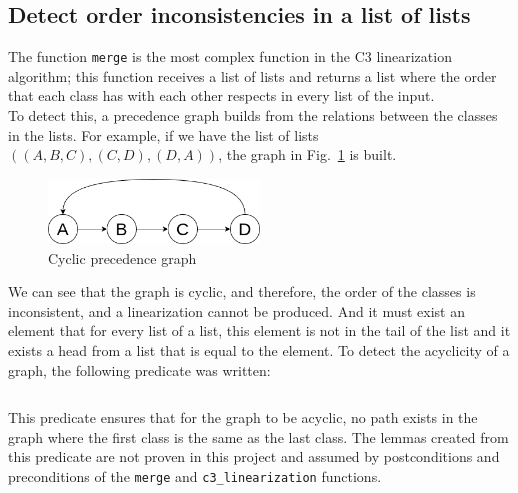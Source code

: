 \documentclass[runningheads]{llncs}
\begin{document}
\subsection{Detect order inconsistencies in a list of lists}
The function \texttt{merge} is the most complex function in the C3 linearization algorithm; this function receives a list of lists and returns a list where the order that each class has with each other respects in every list of the input.\\
To detect this, a precedence graph builds from the relations between the classes in the lists. For example, if we have the list of lists $((A, B, C),(C, D),(D, A))$, the graph in Fig.~\ref{fig:cyclicGraph} is built.
\begin{figure}[htbp]
  \centering
  \includegraphics[width=0.5\textwidth]{images/cyclicGraph.png}
  \caption{Cyclic precedence graph}
  \label{fig:cyclicGraph}
\end{figure}
We can see that the graph is cyclic, and therefore, the order of the classes is inconsistent, and a linearization cannot be produced.
And it must exist an element that for every list of a list, this element is not in the tail of the list and it exists a head from a list that is equal to the element. %
To detect the acyclicity of a graph, the following predicate was written:
\inputminted[firstline=64,lastline=80,fontsize=\small,linenos,xleftmargin=20pt]{ocaml}{../cameleer/c3.ml}
This predicate ensures that for the graph to be acyclic, no path exists in the graph where the first class is the same as the last class.
The lemmas created from this predicate are not proven in this project and assumed by postconditions and preconditions of the \texttt{merge} and \texttt{c3\_linearization} functions.

\printbibliography
\end{document}
